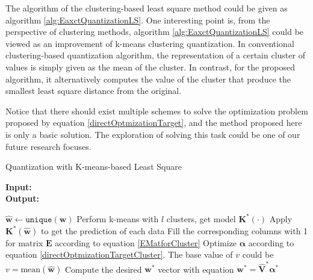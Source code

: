 \documentclass[preprint,10pt]{elsarticle}
\begin{document}
The algorithm of the clustering-based least square method could be given as algorithm \ref{alg:EaxctQuantizationLS}. One interesting point is, from the perspective of clustering methods, algorithm \ref{alg:EaxctQuantizationLS} could be viewed as an improvement of k-means clustering quantization. In conventional clustering-based quantization algorithm, the representation of a certain cluster of values is simply given as the mean of the cluster. In contrast, for the proposed algorithm, it alternatively computes the value of the cluster that produce the smallest least square distance from the original.\par
Notice that there should exist multiple schemes to solve the optimization problem proposed by equation \ref{directOptmizationTarget}, and the method proposed here is only a basic solution. The exploration of solving this task could be one of our future research focuses. 
\begin{algorithm}
\caption{Quantization with K-means-based Least Square}\label{alg:EaxctQuantizationLS}
\hspace*{\algorithmicindent} \textbf{Input: } \\
\hspace*{\algorithmicindent} \textbf{Output: } 
\begin{algorithmic}[1]
\State $\boldsymbol{\hat{w}} \gets \texttt{unique}(\boldsymbol{w})$
\State Perform k-means with $l$ clusters, get model $\boldsymbol{K^{*}(\cdot)}$
\State Apply $\boldsymbol{K^{*}(\boldsymbol{\hat{w}})}$ to get the prediction of each data
\State Fill the corresponding columns with 1 for matrix $\boldsymbol{E}$ according to equation \ref{EMatforCluster}
\State Optimize $\boldsymbol{\alpha}$ according to equation \ref{directOptmizationTargetCluster}. The base value of $v$ could be $v = \text{mean}(\boldsymbol{\hat{w}})$
\State Compute the desired $\boldsymbol{w}^{*}$ vector with equation $\boldsymbol{w}^{*} = \boldsymbol{\hat{V}^{*}}\boldsymbol{\alpha}^{*}$
\end{algorithmic}
\end{algorithm}
\end{document}
